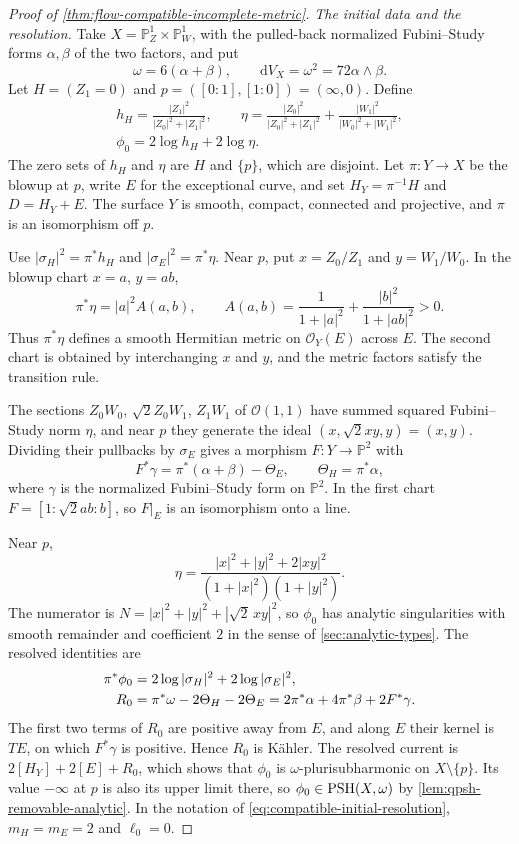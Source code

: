 \begin{proof}[Proof of \cref{thm:flow-compatible-incomplete-metric}]
\emph{The initial data and the resolution.}
Take $X=\mathbb P^1_Z\times\mathbb P^1_W$, with the pulled-back normalized Fubini--Study forms $\alpha,\beta$ of the two factors, and put
\[
 \omega=6(\alpha+\beta),\qquad \mathrm{d}V_X=\omega^2=72\alpha\wedge\beta.
\]
Let $H=(Z_1=0)$ and $p=([0:1],[1:0])=(\infty,0)$. Define
\[
 \begin{gathered}
 h_H=\frac{|Z_1|^2}{|Z_0|^2+|Z_1|^2},\qquad
 \eta=\frac{|Z_0|^2}{|Z_0|^2+|Z_1|^2}
              +\frac{|W_1|^2}{|W_0|^2+|W_1|^2},\\
 \phi_0=2\log h_H+2\log\eta.
 \end{gathered}
\]
The zero sets of $h_H$ and $\eta$ are $H$ and $\{p\}$, which are disjoint. Let $\pi\colon Y\to X$ be the blowup at $p$, write $E$ for the exceptional curve, and set $H_Y=\pi^{-1}H$ and $D=H_Y+E$. The surface $Y$ is smooth, compact, connected and projective, and $\pi$ is an isomorphism off $p$.

Use $|\sigma_H|^2=\pi^*h_H$ and $|\sigma_E|^2=\pi^*\eta$. Near $p$, put $x=Z_0/Z_1$ and $y=W_1/W_0$. In the blowup chart $x=a$, $y=ab$,
\[
 \pi^*\eta=|a|^2A(a,b),\qquad
 A(a,b)=\frac1{1+|a|^2}+\frac{|b|^2}{1+|ab|^2}>0.
\]
Thus $\pi^*\eta$ defines a smooth Hermitian metric on $\mathcal O_Y(E)$ across $E$. The second chart is obtained by interchanging $x$ and $y$, and the metric factors satisfy the transition rule.

The sections $Z_0W_0$, $\sqrt2Z_0W_1$, $Z_1W_1$ of $\mathcal O(1,1)$ have summed squared Fubini--Study norm $\eta$, and near $p$ they generate the ideal $(x,\sqrt2xy,y)=(x,y)$. Dividing their pullbacks by $\sigma_E$ gives a morphism $F\colon Y\to\mathbb P^2$ with
\begin{equation}\label{eq:compatible-curvature-map}
 F^*\gamma=\pi^*(\alpha+\beta)-\Theta_E,\qquad
 \Theta_H=\pi^*\alpha,
\end{equation}
where $\gamma$ is the normalized Fubini--Study form on $\mathbb P^2$. In the first chart $F=[1:\sqrt2ab:b]$, so $F|_E$ is an isomorphism onto a line.

Near $p$,
\[
 \eta=\frac{|x|^2+|y|^2+2|xy|^2}{(1+|x|^2)(1+|y|^2)}.
\]
The numerator is $N=|x|^2+|y|^2+|\sqrt2\,xy|^2$, so $\phi_0$ has analytic singularities with smooth remainder and coefficient $2$ in the sense of \cref{sec:analytic-types}. The resolved identities are
\begin{align}\label{eq:compatible-kahler-residual}
 \pi^*\phi_0&=2\log|\sigma_H|^2+2\log|\sigma_E|^2,\\
 R_0&=\pi^*\omega-2\Theta_H-2\Theta_E
       =2\pi^*\alpha+4\pi^*\beta+2F^*\gamma.\notag
\end{align}
The first two terms of $R_0$ are positive away from $E$, and along $E$ their kernel is $TE$, on which $F^*\gamma$ is positive. Hence $R_0$ is K\"ahler. The resolved current is $2[H_Y]+2[E]+R_0$, which shows that $\phi_0$ is $\omega$-plurisubharmonic on $X\setminus\{p\}$. Its value $-\infty$ at $p$ is also its upper limit there, so $\phi_0\in\mathrm{PSH}(X,\omega)$ by \cref{lem:qpsh-removable-analytic}. In the notation of \eqref{eq:compatible-initial-resolution}, $m_H=m_E=2$ and $\ell_0=0$.


\end{proof}
